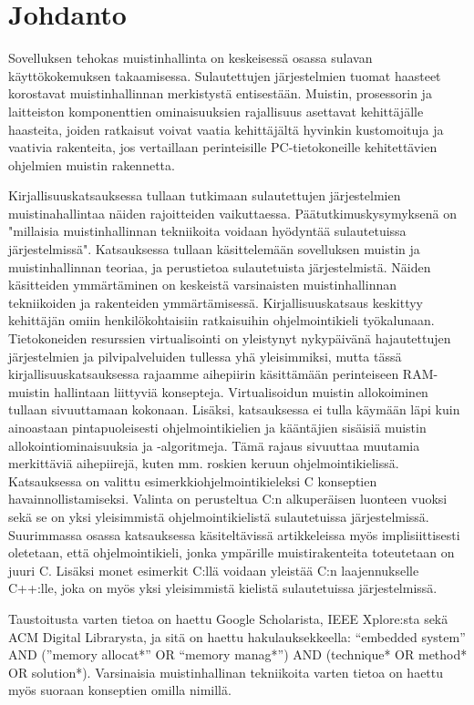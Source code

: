\chapter{Johdanto} \label{Johdanto}

Sovelluksen tehokas muistinhallinta on keskeisessä osassa sulavan käyttökokemuksen takaamisessa. Sulautettujen järjestelmien tuomat haasteet korostavat muistinhallinnan merkistystä entisestään. Muistin, prosessorin ja laitteiston komponenttien ominaisuuksien rajallisuus asettavat kehittäjälle haasteita, joiden ratkaisut voivat vaatia kehittäjältä hyvinkin kustomoituja ja vaativia rakenteita, jos vertaillaan perinteisille PC-tietokoneille kehitettävien ohjelmien muistin rakennetta.

Kirjallisuuskatsauksessa tullaan tutkimaan sulautettujen järjestelmien muistinahallintaa näiden rajoitteiden vaikuttaessa. Päätutkimuskysymyksenä on "millaisia muistinhallinnan tekniikoita voidaan hyödyntää sulautetuissa järjestelmissä". Katsauksessa tullaan käsittelemään sovelluksen muistin ja muistinhallinnan teoriaa, ja perustietoa sulautetuista järjestelmistä. Näiden käsitteiden ymmärtäminen on keskeistä varsinaisten muistinhallinnan tekniikoiden ja rakenteiden ymmärtämisessä. Kirjallisuuskatsaus keskittyy kehittäjän omiin henkilökohtaisiin ratkaisuihin ohjelmointikieli työkalunaan. Tietokoneiden resurssien virtualisointi on yleistynyt nykypäivänä hajautettujen järjestelmien ja pilvipalveluiden tullessa yhä yleisimmiksi, mutta tässä kirjallisuuskatsauksessa rajaamme aihepiirin käsittämään perinteiseen RAM-muistin hallintaan liittyviä konsepteja. Virtualisoidun muistin allokoiminen tullaan sivuuttamaan kokonaan. Lisäksi, katsauksessa ei tulla käymään läpi kuin ainoastaan pintapuoleisesti ohjelmointikielien ja kääntäjien sisäisiä muistin allokointiominaisuuksia ja -algoritmeja. Tämä rajaus sivuuttaa muutamia merkittäviä aihepiirejä, kuten mm. roskien keruun ohjelmointikielissä. Katsauksessa on valittu esimerkkiohjelmointikieleksi C konseptien havainnollistamiseksi. Valinta on perusteltua C:n alkuperäisen luonteen vuoksi sekä se on yksi yleisimmistä ohjelmointikielistä sulautetuissa järjestelmissä. Suurimmassa osassa katsauksessa käsiteltävissä artikkeleissa myös implisiittisesti oletetaan, että ohjelmointikieli, jonka ympärille muistirakenteita toteutetaan on juuri C. Lisäksi monet esimerkit C:llä voidaan yleistää C:n laajennukselle C++:lle, joka on myös yksi yleisimmistä kielistä sulautetuissa järjestelmissä.

Taustoitusta varten tietoa on haettu Google Scholarista, IEEE Xplore:sta sekä ACM Digital Librarysta, ja sitä on haettu hakulauksekkeella: “embedded system” AND (”memory allocat*” OR “memory manag*”) AND (technique* OR method* OR solution*). Varsinaisia muistinhallinan tekniikoita varten tietoa on haettu myös suoraan konseptien omilla nimillä.